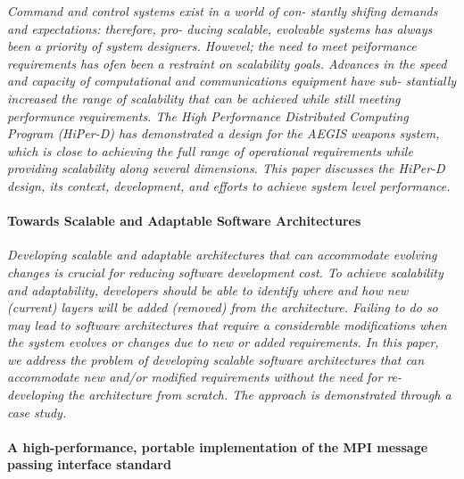 \documentclass{article}
\begin{document}
\emph{ Command and control systems exist in a world of con- stantly shifing
demands and expectations: therefore, pro- ducing scalable, evolvable systems
has always been a priority of system designers. Howevel; the need to meet
peiformance requirements has ofen been a restraint on scalability goals.
Advances in the speed and capacity of computational and communications
equipment have sub- stantially increased the range of scalability that can be
achieved while still meeting performunce requirements.  The High Performance
Distributed Computing Program (HiPer-D) has demonstrated a design for the AEGIS
weapons system, which is close to achieving the full range of operational
requirements while providing scalability along several dimensions. This paper
discusses the HiPer-D design, its context, development, and efforts to achieve
system level performance.}

\paragraph{Towards Scalable and Adaptable Software Architectures} \cite{fayad2005towards}

\emph{Developing scalable and adaptable architectures that can accommodate
evolving changes is crucial for reducing software development cost. To achieve
scalability and adaptability, developers should be able to identify where and
how new (current) layers will be added (removed) from the architecture.
Failing to do so may lead to software architectures that require a considerable
modifications when the system evolves or changes due to new or added
requirements. In this paper, we address the problem of developing scalable
software architectures that can accommodate new and/or modified requirements
without the need for re-developing the architecture from scratch. The approach
is demonstrated through a case study.}

\paragraph{A high-performance, portable implementation of the MPI message passing
interface standard} \cite{gropp1996high}
\end{document}
